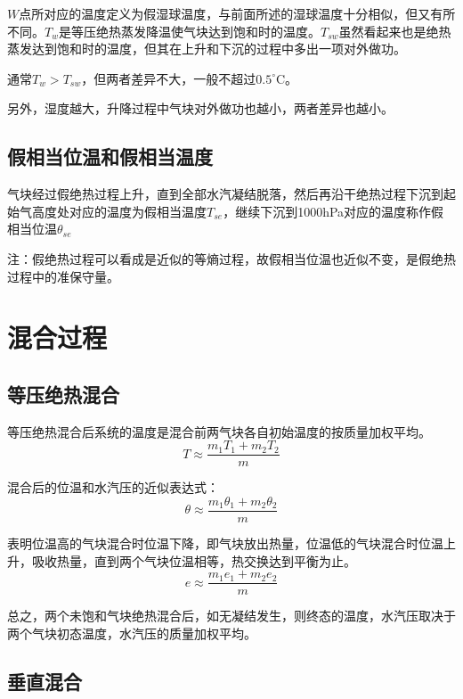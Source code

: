 \documentclass[UTF8,a4paper,11pt,oneside]{ctexbook}
\begin{document}
\(W\)点所对应的温度定义为假湿球温度，与前面所述的湿球温度十分相似，但又有所不同。\(T_w\)是等压绝热蒸发降温使气块达到饱和时的温度。\(T_{sw}\)虽然看起来也是绝热蒸发达到饱和时的温度，但其在上升和下沉的过程中多出一项对外做功。

通常\(T_w>T_{sw}\)，但两者差异不大，一般不超过\(0.5^\circ\mathrm{C}\)。

另外，湿度越大，升降过程中气块对外做功也越小，两者差异也越小。

\subsection{假相当位温和假相当温度}

气块经过假绝热过程上升，直到全部水汽凝结脱落，然后再沿干绝热过程下沉到起始气高度处对应的温度为假相当温度\(T_{se}\)，继续下沉到1000hPa对应的温度称作假相当位温\(\theta_{se}\)

注：假绝热过程可以看成是近似的等熵过程，故假相当位温也近似不变，是假绝热过程中的准保守量。

\section{混合过程}

\subsection{等压绝热混合}

等压绝热混合后系统的温度是混合前两气块各自初始温度的按质量加权平均。
\begin{equation}
T\approx\dfrac{m_1T_1+m_2T_2}{m}
\end{equation}

混合后的位温和水汽压的近似表达式：
\begin{equation}
\theta\approx\dfrac{m_1\theta_1+m_2\theta_2}{m}
\end{equation}

表明位温高的气块混合时位温下降，即气块放出热量，位温低的气块混合时位温上升，吸收热量，直到两个气块位温相等，热交换达到平衡为止。
\begin{equation}
e\approx\dfrac{m_1e_1+m_2e_2}{m}
\end{equation}

总之，两个未饱和气块绝热混合后，如无凝结发生，则终态的温度，水汽压取决于两个气块初态温度，水汽压的质量加权平均。

\subsection{垂直混合}
\end{document}

